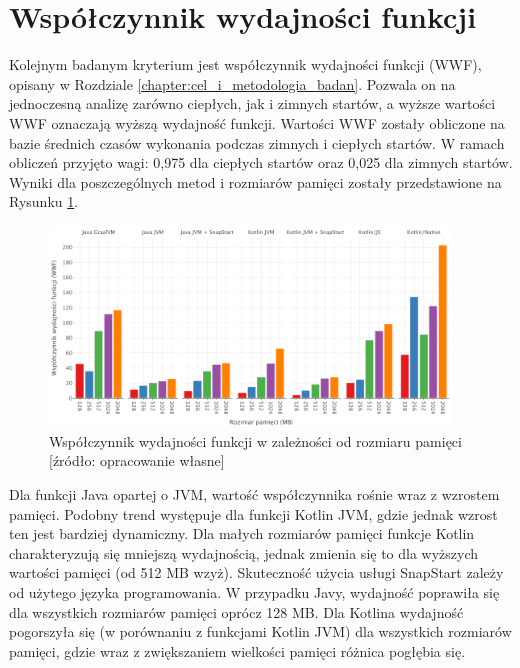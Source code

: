 \newpage
\section{Współczynnik wydajności funkcji}\label{chapter:results_wwf}

Kolejnym badanym kryterium jest współczynnik wydajności funkcji (WWF), opisany w Rozdziale \ref{chapter:cel_i_metodologia_badan}.
Pozwala on na jednoczesną analizę zarówno ciepłych, jak i zimnych startów, a wyższe wartości WWF oznaczają wyższą wydajność funkcji.
Wartości WWF zostały obliczone na bazie średnich czasów wykonania podczas zimnych i ciepłych startów.
W ramach obliczeń przyjęto wagi: 0,975 dla ciepłych startów oraz 0,025 dla zimnych startów.
Wyniki dla poszczególnych metod i rozmiarów pamięci zostały przedstawione na Rysunku \ref{fig:avg_wwf}.

\begin{figure}[h]
    \centering
    \includegraphics[width=0.95\textwidth]{charts/results/wwf.png}
    \caption{Współczynnik wydajności funkcji w zależności od rozmiaru pamięci [źródło: opracowanie własne]}
    \label{fig:avg_wwf}
\end{figure}

Dla funkcji Java opartej o JVM, wartość współczynnika rośnie wraz z wzrostem pamięci.
Podobny trend występuje dla funkcji Kotlin JVM, gdzie jednak wzrost ten jest bardziej dynamiczny.
Dla małych rozmiarów pamięci funkcje Kotlin charakteryzują się mniejszą wydajnością, jednak zmienia się to dla wyższych wartości pamięci (od 512 MB wzyż).
Skuteczność użycia usługi SnapStart zależy od użytego języka programowania.
W przypadku Javy, wydajność poprawiła się dla wszystkich rozmiarów pamięci oprócz 128 MB. 
Dla Kotlina wydajność pogorszyła się (w porównaniu z funkcjami Kotlin JVM) dla wszystkich rozmiarów pamięci, gdzie wraz z zwiększaniem wielkości pamięci różnica pogłębia się.

